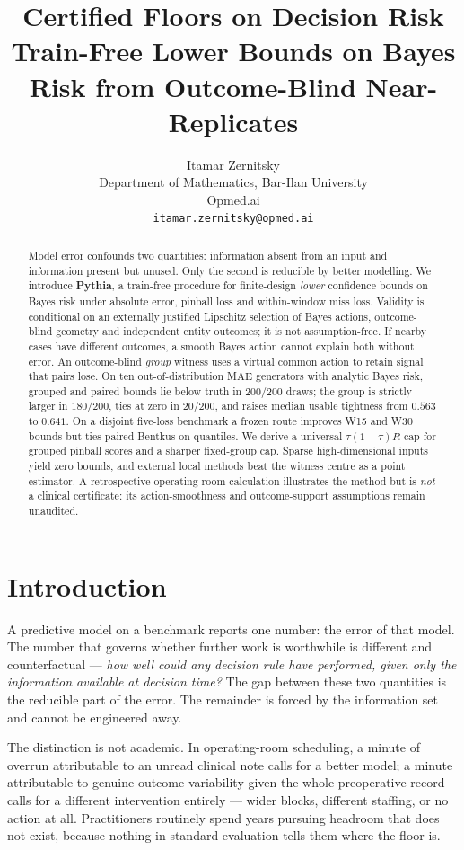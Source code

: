 \documentclass[11pt]{article}
\title{\bfseries Certified Floors on Decision Risk\\[2pt]
\large Train-Free Lower Bounds on Bayes Risk from Outcome-Blind Near-Replicates}
\author{Itamar Zernitsky\\
Department of Mathematics, Bar-Ilan University\\
Opmed.ai\\
\texttt{itamar.zernitsky@opmed.ai}}
\date{}
\theoremstyle{definition}
\begin{document}
\maketitle

\begin{abstract}
Model error confounds two quantities: information absent from an input and information present but unused. Only the second is reducible by better modelling. We introduce \textbf{Pythia}, a train-free procedure for finite-design \emph{lower} confidence bounds on Bayes risk under absolute error, pinball loss and within-window miss loss. Validity is conditional on an externally justified Lipschitz selection of Bayes actions, outcome-blind geometry and independent entity outcomes; it is not assumption-free. If nearby cases have different outcomes, a smooth Bayes action cannot explain both without error. An outcome-blind \emph{group} witness uses a virtual common action to retain signal that pairs lose. On ten out-of-distribution MAE generators with analytic Bayes risk, grouped and paired bounds lie below truth in $200/200$ draws; the group is strictly larger in $180/200$, ties at zero in $20/200$, and raises median usable tightness from $0.563$ to $0.641$. On a disjoint five-loss benchmark a frozen route improves W15 and W30 bounds but ties paired Bentkus on quantiles. We derive a universal $\tau(1-\tau)R$ cap for grouped pinball scores and a sharper fixed-group cap. Sparse high-dimensional inputs yield zero bounds, and external local methods beat the witness centre as a point estimator. A retrospective operating-room calculation illustrates the method but is \emph{not} a clinical certificate: its action-smoothness and outcome-support assumptions remain unaudited.
\end{abstract}

\section{Introduction}

A predictive model on a benchmark reports one number: the error of that model. The number that governs whether further work is worthwhile is different and counterfactual --- \emph{how well could any decision rule have performed, given only the information available at decision time?} The gap between these two quantities is the reducible part of the error. The remainder is forced by the information set and cannot be engineered away.

The distinction is not academic. In operating-room scheduling, a minute of overrun attributable to an unread clinical note calls for a better model; a minute attributable to genuine outcome variability given the whole preoperative record calls for a different intervention entirely --- wider blocks, different staffing, or no action at all. Practitioners routinely spend years pursuing headroom that does not exist, because nothing in standard evaluation tells them where the floor is.
\end{document}
